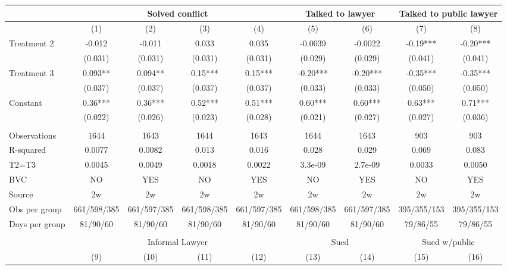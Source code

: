 \begin{tabular}{lcccccccc}
\toprule
      & \multicolumn{4}{c}{Solved conflict} & \multicolumn{2}{c}{Talked to lawyer} & \multicolumn{2}{c}{Talked to public lawyer} \\
\midrule
\midrule
      & (1)   & (2)   & (3)   & (4)   & (5)   & (6)   & (7)   & (8) \\
\midrule
\midrule
Treatment 2 & -0.012 & -0.011 & 0.033 & 0.035 & -0.0039 & -0.0022 & -0.19*** & -0.20*** \\
      & (0.031) & (0.031) & (0.031) & (0.031) & (0.029) & (0.029) & (0.041) & (0.041) \\
Treatment 3 & 0.093** & 0.094** & 0.15*** & 0.15*** & -0.20*** & -0.20*** & -0.35*** & -0.35*** \\
      & (0.037) & (0.037) & (0.037) & (0.037) & (0.033) & (0.033) & (0.050) & (0.050) \\
Constant  & 0.36*** & 0.36*** & 0.52*** & 0.51*** & 0.60*** & 0.60*** & 0.63*** & 0.71*** \\
      & (0.022) & (0.026) & (0.023) & (0.028) & (0.021) & (0.027) & (0.027) & (0.036) \\
      &       &       &       &       &       &       &       &  \\
\midrule
Observations & 1644  & 1643  & 1644  & 1643  & 1644  & 1643  & 903   & 903 \\
R-squared & 0.0077 & 0.0082 & 0.013 & 0.016 & 0.028 & 0.029 & 0.069 & 0.083 \\
T2=T3 & 0.0045 & 0.0049 & 0.0018 & 0.0022 & 3.3e-09 & 2.7e-09 & 0.0033 & 0.0050 \\
BVC   & NO    & YES   & NO    & YES   & NO    & YES   & NO    & YES \\
Source & 2w    & 2w    & 2w    & 2w    & 2w    & 2w    & 2w    & 2w \\
Obs per group & 661/598/385 & 661/597/385 & 661/598/385 & 661/597/385 & 661/598/385 & 661/597/385 & 395/355/153 & 395/355/153 \\
Days per group & 81/90/60 & 81/90/60 & 81/90/60 & 81/90/60 & 81/90/60 & 81/90/60 & 79/86/55 & 79/86/55 \\
\midrule
\midrule
      &       &       &       &       &       &       &       &  \\
\midrule
      & \multicolumn{4}{c}{Informal Lawyer} & \multicolumn{2}{c}{Sued} & \multicolumn{2}{c}{Sued w/public} \\
\midrule
\midrule
      & (9)   & (10)  & (11)  & (12)  & (13)  & (14)  & (15)  & (16) \\

\end{tabular}
